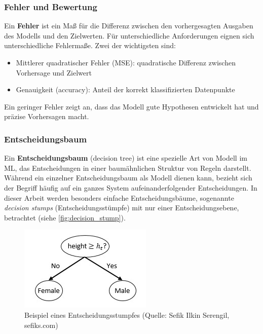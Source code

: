 \subsubsection{Fehler und Bewertung}
Ein \textbf{Fehler} ist ein Maß für die Differenz zwischen den vorhergesagten Ausgaben des Modells und den Zielwerten. Für unterschiedliche Anforderungen eignen sich unterschiedliche Fehlermaße. Zwei der wichtigsten sind:

\begin{itemize}
    \item Mittlerer quadratischer Fehler (MSE): quadratische Differenz zwischen Vorhersage und Zielwert
    \item Genauigkeit (accuracy): Anteil der korrekt klassifizierten Datenpunkte
\end{itemize}
Ein geringer Fehler zeigt an, dass das Modell gute Hypothesen entwickelt hat und präzise Vorhersagen macht.

\subsubsection{Entscheidungsbaum}
Ein \textbf{Entscheidungsbaum} (decision tree) ist eine spezielle Art von Modell im ML, das Entscheidungen in einer baumähnlichen Struktur von Regeln darstellt. Während ein einzelner Entscheidungsbaum als Modell dienen kann, bezieht sich der Begriff häufig auf ein ganzes System aufeinanderfolgender Entscheidungen. In dieser Arbeit werden besonders einfache Entscheidungsbäume, sogenannte \textit{decision stumps} (Entscheidungsstümpfe) mit nur einer Entscheidungsebene, betrachtet (siehe \autoref{fig:decision_stump}).

\begin{figure}[h]
    \centering
    \includegraphics[width=0.5\linewidth]{Images/decision_stump.png}
    \caption[Beispiel eines Entscheidungsstumpfes]{Beispiel eines Entscheidungsstumpfes (Quelle: Sefik Ilkin Serengil, sefiks.com)}
    \label{fig:decision_stump}
\end{figure}


